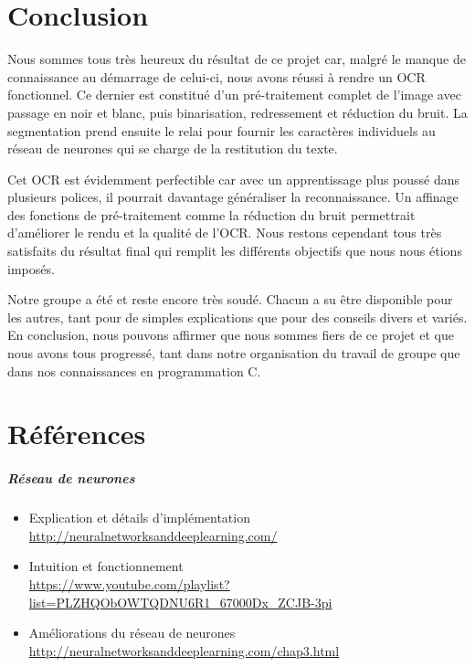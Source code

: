 \chapter{Conclusion}

Nous sommes tous très heureux du résultat de ce projet car, malgré le manque de
connaissance au démarrage de celui-ci, nous avons réussi à rendre un OCR
fonctionnel. Ce dernier est constitué d'un pré-traitement complet de l'image
avec passage en noir et blanc, puis binarisation, redressement et réduction du
bruit. La segmentation prend ensuite le relai pour fournir les caractères
individuels au réseau de neurones qui se charge de la restitution du texte.

Cet OCR est évidemment perfectible car avec un apprentissage plus poussé dans
plusieurs polices, il pourrait davantage généraliser la reconnaissance. Un
affinage des fonctions de pré-traitement comme la réduction du bruit permettrait
d'améliorer le rendu et la qualité de l'OCR. Nous restons cependant tous très
satisfaits du résultat final qui remplit les différents objectifs que nous nous
étions imposés.

Notre groupe a été et reste encore très soudé. Chacun a su être disponible pour
les autres, tant pour de simples explications que pour des conseils divers et
variés. En conclusion, nous pouvons affirmer que nous sommes fiers de ce projet
et que nous avons tous progressé, tant dans notre organisation du travail de
groupe que dans nos connaissances en programmation C.

\chapter{Références}

\paragraph{\bfseries{Réseau de neurones}}

\begin{itemize}
    \item Explication et détails d'implémentation \\
    \url{http://neuralnetworksanddeeplearning.com/}
    \item Intuition et fonctionnement \\
    \url{https://www.youtube.com/playlist?list=PLZHQObOWTQDNU6R1_67000Dx_ZCJB-3pi}
    \item Améliorations du réseau de neurones \\
    \url{http://neuralnetworksanddeeplearning.com/chap3.html}
\end{itemize}

